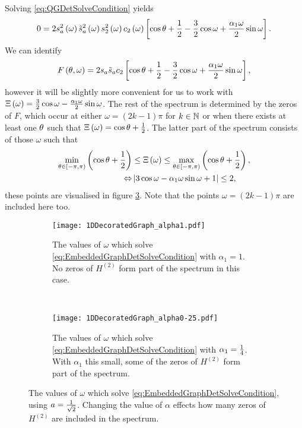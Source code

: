 Solving \eqref{eq:QGDetSolveCondition} yields
\begin{align} \label{eq:EmbeddedGraphDetSolveCondition}
	0 = 2s_a^2\left( \omega \right) \tilde{s}_a^2\left( \omega \right) s_2^2\left( \omega \right) c_2\left( \omega \right)
	\left[  \cos\theta + \frac{1}{2} - \frac{3}{2}\cos\omega + \frac{\alpha_1\omega}{2}\sin\omega  \right].
\end{align}
We can identify 
\begin{align*}
	F\left( \theta,\omega \right) = 2 s_a \tilde{s}_a c_2
	\left[  \cos\theta + \frac{1}{2} - \frac{3}{2}\cos\omega + \frac{\alpha_1\omega}{2}\sin\omega  \right],
\end{align*}
however it will be slightly more convenient for us to work with $\Xi\left( \omega \right) = \frac{3}{2}\cos\omega - \frac{\alpha_1\omega}{2}\sin\omega$.
The rest of the spectrum is determined by the zeros of $F$, which occur at either $\omega=(2k-1)\pi$ for $k\in\mathbb{N}$ or when there exists at least one $\theta$ such that $\Xi\left( \omega \right) = \cos\theta + \frac{1}{2}$.
The latter part of the spectrum consists of those $\omega$ such that
\begin{align*}
	\min_{\theta\in\left[-\pi,\pi\right)}\left( \cos\theta + \frac{1}{2} \right) &\leq \Xi\left( \omega \right) 
	\leq \max_{\theta\in\left[-\pi,\pi\right)} \left( \cos\theta + \frac{1}{2} \right), \\
	\Leftrightarrow & \left\lvert  3\cos\omega - \alpha_1\omega\sin\omega + 1  \right\rvert \leq 2, 
\end{align*}
these points are visualised in figure \ref{fig:1DDecoratedGraph}.
Note that the points $\omega=(2k-1)\pi$ are included here too.
\begin{figure}[b!]
	\centering
	\begin{subfigure}[t]{0.45\textwidth}
		\centering
		\texttt{[image: 1DDecoratedGraph\_alpha1.pdf]}
		\caption[]{\label{fig:1DDecoratedGraph_alpha1} The values of $\omega$ which solve \eqref{eq:EmbeddedGraphDetSolveCondition} with $\alpha_1=1$. No zeros of $H^{(2)}$ form part of the spectrum in this case.}
	\end{subfigure}
	~
	\begin{subfigure}[t]{0.45\textwidth}
		\centering
		\texttt{[image: 1DDecoratedGraph\_alpha0-25.pdf]}
		\caption[]{\label{fig:1DDecoratedGraph_alpha0-25} The values of $\omega$ which solve \eqref{eq:EmbeddedGraphDetSolveCondition} with $\alpha_1=\frac{1}{4}$. With $\alpha_1$ this small, some of the zeros of $H^{(2)}$ form part of the spectrum.}
	\end{subfigure}
	\caption[The spectrum of \eqref{eq:SingularScalarWaveEqn} on the geometry of section \ref{ssec:EmbeddingDependentExample}, and the corresponding poles of the determinant of the $M$-matrix.]{\label{fig:1DDecoratedGraph} The values of $\omega$ which solve \eqref{eq:EmbeddedGraphDetSolveCondition}, using $a=\frac{1}{\sqrt{2}}$. Changing the value of $\alpha$ effects how many zeros of $H^{(2)}$ are included in the spectrum.}
\end{figure}

